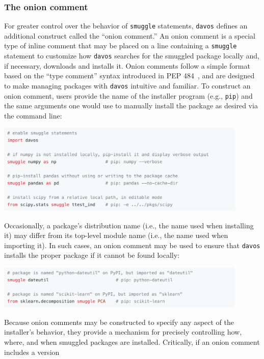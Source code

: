 \documentclass[preprint,12pt,a4paper]{elsarticle}
\begin{document}
\subsubsection{The onion comment}\label{subsec:onion}

For greater control over the behavior of \texttt{smuggle} statements,
\texttt{davos} defines an additional construct called the ``onion
comment.'' An onion comment is a special type of inline comment that
may be placed on a line containing a \texttt{smuggle} statement to
customize how \texttt{davos} searches for the smuggled package locally
and, if necessary, downloads and installs it. Onion comments follow a
simple format based on the ``type comment'' syntax introduced in PEP
484~\cite{vanREtal14}, and are designed to make managing packages with
\texttt{davos} intuitive and familiar. To construct an onion comment,
users provide the name of the installer program (e.g., \texttt{pip})
and the same arguments one would use to manually install the package
as desired via the command line:
\begin{center}
\includegraphics[width=0.9\textwidth]{figs/snippet1}
\end{center}
Occasionally, a package's distribution name (i.e., the name used when
installing it) may differ from its top-level module name (i.e., the
name used when importing it). In such cases, an onion comment may be
used to ensure that \texttt{davos} installs the proper package if it
cannot be found locally:
\begin{center}
\includegraphics[width=0.9\textwidth]{figs/snippet2}
\end{center}
Because onion comments may be constructed to specify any aspect of the
installer's behavior, they provide a mechanism for precisely
controlling how, where, and when smuggled packages are installed.
Critically, if an onion comment includes a version
\end{document}
